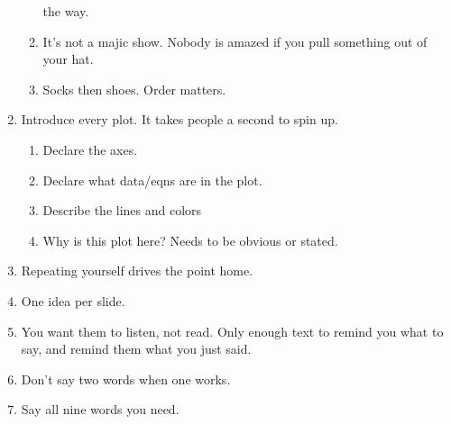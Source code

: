 \documentclass[fleqn,usenatbib,useAMS]{mnras}
\begin{document}
\begin{enumerate}
\begin{enumerate}
                the way.
            \item It's not a majic show.  Nobody is amazed if you pull something
                out of your hat.
            \item Socks then shoes.  Order matters.
        \end{enumerate}
    \item Introduce every plot.  It takes people a second to spin up.
        \begin{enumerate}
            \item Declare the axes.
            \item Declare what data/eqns are in the plot.
            \item Describe the lines and colors
            \item Why is this plot here?  Needs to be obvious or stated.
        \end{enumerate}
    \item Repeating yourself drives the point home.
    \item One idea per slide.
    \item You want them to listen, not read. Only enough text to remind you what
        to say, and remind them what you just said.
    \item Don't say two words when one works.
    \item Say all nine words you need.
\end{enumerate}

%

%

%
%
%
%
%
\end{document}
